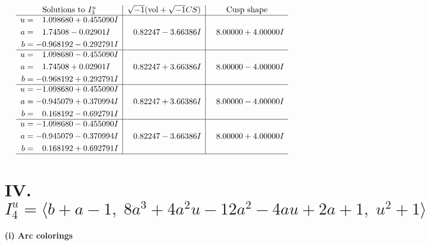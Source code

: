 \documentclass[1p]{elsarticle_modified}
\theoremstyle{definition}
\newcommand{\I}{\sqrt{-1}}
\begin{document}
$$\begin{array}{c|c|c}  
\text{Solutions to }I^u_{3}& \I (\text{vol} + \sqrt{-1}CS) & \text{Cusp shape}\\
 \hline 
\begin{aligned}
u &= \phantom{-}1.098680 + 0.455090 I \\
a &= \phantom{-}1.74508 - 0.02901 I \\
b &= -0.968192 - 0.292791 I\end{aligned}
 & \phantom{-}0.82247 - 3.66386 I & \phantom{-}8.00000 + 4.00000 I \\ \hline\begin{aligned}
u &= \phantom{-}1.098680 - 0.455090 I \\
a &= \phantom{-}1.74508 + 0.02901 I \\
b &= -0.968192 + 0.292791 I\end{aligned}
 & \phantom{-}0.82247 + 3.66386 I & \phantom{-}8.00000 - 4.00000 I \\ \hline\begin{aligned}
u &= -1.098680 + 0.455090 I \\
a &= -0.945079 + 0.370994 I \\
b &= \phantom{-}0.168192 - 0.692791 I\end{aligned}
 & \phantom{-}0.82247 + 3.66386 I & \phantom{-}8.00000 - 4.00000 I \\ \hline\begin{aligned}
u &= -1.098680 - 0.455090 I \\
a &= -0.945079 - 0.370994 I \\
b &= \phantom{-}0.168192 + 0.692791 I\end{aligned}
 & \phantom{-}0.82247 - 3.66386 I & \phantom{-}8.00000 + 4.00000 I\\
 \hline 
 \end{array}$$\newpage\newpage\renewcommand{\arraystretch}{1}
\centering \section*{IV. $I^u_{4}= \langle b+a-1,\;8 a^3+4 a^2 u-12 a^2-4 a u+2 a+1,\;u^2+1 \rangle$}
\flushleft \textbf{(i) Arc colorings}\\
\end{document}
